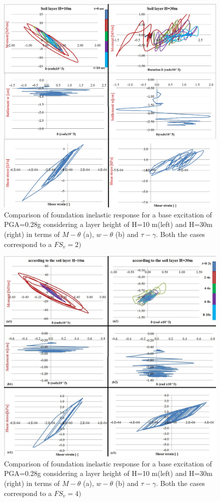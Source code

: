     \begin{figure}[!h]
    	\centering
    	\includegraphics[width=1\linewidth]{"10m_F2"}
    	\caption{Comparison of foundation inelastic response for a base excitation of PGA=0.28g considering a layer height of H=10 m(left) and H=30m (right) in terms of $M-\theta$ (a), $w-\theta$ (b) and $\tau-\gamma$. Both the cases correspond to a $FS_v=2)$}
    	\label{10m}
    \end{figure}
    
  
  \begin{figure}[!h]
  	\centering
  	\includegraphics[width=1 \linewidth]{"10m"}
  	\caption{Comparison of foundation inelastic response for a base excitation of PGA=0.28g considering a layer height of H=10 m(left) and H=30m (right) in terms of $M-\theta$ (a), $w-\theta$ (b) and $\tau-\gamma$. Both the cases correspond to a $FS_v=4)$}
  	\label{10m2}
  \end{figure}

